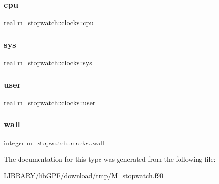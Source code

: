 \subsubsection{\texorpdfstring{cpu}{cpu}}
{\footnotesize\ttfamily \hyperlink{read__watch_83_8txt_abdb62bde002f38ef75f810d3a905a823}{real} m\+\_\+stopwatch\+::clocks\+::cpu\hspace{0.3cm}{\ttfamily [private]}}

\mbox{\label{structm__stopwatch_1_1clocks_a86554366f47cf591953288ad9addea53}} 
\subsubsection{\texorpdfstring{sys}{sys}}
{\footnotesize\ttfamily \hyperlink{read__watch_83_8txt_abdb62bde002f38ef75f810d3a905a823}{real} m\+\_\+stopwatch\+::clocks\+::sys\hspace{0.3cm}{\ttfamily [private]}}

\mbox{\label{structm__stopwatch_1_1clocks_a6734a01073d44a271b14f6c7e266fa61}} 
\subsubsection{\texorpdfstring{user}{user}}
{\footnotesize\ttfamily \hyperlink{read__watch_83_8txt_abdb62bde002f38ef75f810d3a905a823}{real} m\+\_\+stopwatch\+::clocks\+::user\hspace{0.3cm}{\ttfamily [private]}}

\mbox{\label{structm__stopwatch_1_1clocks_a8c979e58959961744ee85e5f44fbaf64}} 
\subsubsection{\texorpdfstring{wall}{wall}}
{\footnotesize\ttfamily integer m\+\_\+stopwatch\+::clocks\+::wall\hspace{0.3cm}{\ttfamily [private]}}



The documentation for this type was generated from the following file\+:\begin{DoxyCompactItemize}
\item 
L\+I\+B\+R\+A\+R\+Y/lib\+G\+P\+F/download/tmp/\hyperlink{M__stopwatch_8f90}{M\+\_\+stopwatch.\+f90}\end{DoxyCompactItemize}
